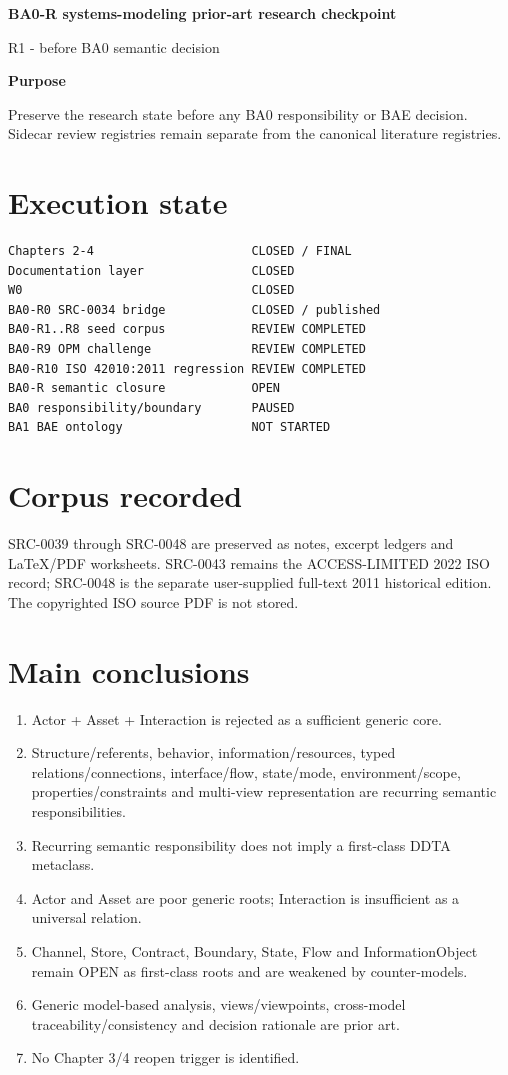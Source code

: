 \documentclass[10pt,a4paper]{article}
\newenvironment{challenge}[1]{\def\FrameCommand{\fcolorbox{ddtaorange}{ddtagray}}\MakeFramed{\advance\hsize-2\width\FrameRestore}\noindent\textbf{#1}\par\smallskip}{\endMakeFramed}
\begin{document}
\begin{center}{\LARGE\bfseries BA0-R systems-modeling prior-art research checkpoint}\par{\large R1 - before BA0 semantic decision}\par{}\end{center}
\begin{challenge}{Purpose}Preserve the research state before any BA0 responsibility or BAE decision. Sidecar review registries remain separate from the canonical literature registries.\end{challenge}
\section{Execution state}
\begin{lstlisting}
Chapters 2-4                      CLOSED / FINAL
Documentation layer               CLOSED
W0                                CLOSED
BA0-R0 SRC-0034 bridge            CLOSED / published
BA0-R1..R8 seed corpus            REVIEW COMPLETED
BA0-R9 OPM challenge              REVIEW COMPLETED
BA0-R10 ISO 42010:2011 regression REVIEW COMPLETED
BA0-R semantic closure            OPEN
BA0 responsibility/boundary       PAUSED
BA1 BAE ontology                  NOT STARTED
\end{lstlisting}
\section{Corpus recorded}
SRC-0039 through SRC-0048 are preserved as notes, excerpt ledgers and LaTeX/PDF worksheets. SRC-0043 remains the ACCESS-LIMITED 2022 ISO record; SRC-0048 is the separate user-supplied full-text 2011 historical edition. The copyrighted ISO source PDF is not stored.
\section{Main conclusions}
\begin{enumerate}
\item Actor + Asset + Interaction is rejected as a sufficient generic core.
\item Structure/referents, behavior, information/resources, typed relations/connections, interface/flow, state/mode, environment/scope, properties/constraints and multi-view representation are recurring semantic responsibilities.
\item Recurring semantic responsibility does not imply a first-class DDTA metaclass.
\item Actor and Asset are poor generic roots; Interaction is insufficient as a universal relation.
\item Channel, Store, Contract, Boundary, State, Flow and InformationObject remain OPEN as first-class roots and are weakened by counter-models.
\item Generic model-based analysis, views/viewpoints, cross-model traceability/consistency and decision rationale are prior art.
\item No Chapter 3/4 reopen trigger is identified.
\end{enumerate}
\end{document}
